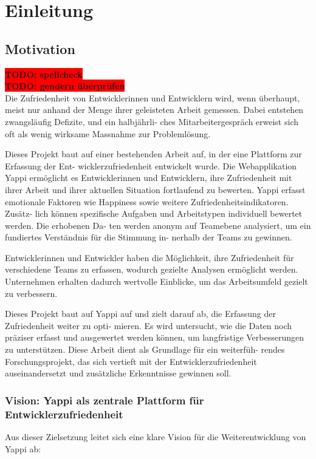 \documentclass[12pt,a4paper]{report}
\newcommand{\todo}[1]{\colorbox{red}{\textbf{TODO: #1}}\\}
\begin{document}
\chapter{Einleitung}

\section{Motivation}
\todo{spellcheck}
\todo{gendern überprüfen}

Die Zufriedenheit von Entwicklerinnen und Entwicklern wird, wenn überhaupt, meist nur anhand der
Menge ihrer geleisteten Arbeit gemessen. Dabei entstehen zwangsläufig Defizite, und ein halbjährli-
ches Mitarbeitergespräch erweist sich oft als wenig wirksame Massnahme zur Problemlösung.

Dieses Projekt baut auf einer bestehenden Arbeit auf, in der eine Plattform zur Erfassung der Ent-
wicklerzufriedenheit entwickelt wurde. Die Webapplikation Yappi ermöglicht es Entwicklerinnen und
Entwicklern, ihre Zufriedenheit mit ihrer Arbeit und ihrer aktuellen Situation fortlaufend zu bewerten.
Yappi erfasst emotionale Faktoren wie Happiness sowie weitere Zufriedenheitsindikatoren. Zusätz-
lich können spezifische Aufgaben und Arbeitstypen individuell bewertet werden. Die erhobenen Da-
ten werden anonym auf Teamebene analysiert, um ein fundiertes Verständnis für die Stimmung in-
nerhalb der Teams zu gewinnen.

Entwicklerinnen und Entwickler haben die Möglichkeit, ihre Zufriedenheit für verschiedene Teams zu
erfassen, wodurch gezielte Analysen ermöglicht werden. Unternehmen erhalten dadurch wertvolle
Einblicke, um das Arbeitsumfeld gezielt zu verbessern.

Dieses Projekt baut auf Yappi auf und zielt darauf ab, die Erfassung der Zufriedenheit weiter zu opti-
mieren. Es wird untersucht, wie die Daten noch präziser erfasst und ausgewertet werden können,
um langfristige Verbesserungen zu unterstützen. Diese Arbeit dient als Grundlage für ein weiterfüh-
rendes Forschungsprojekt, das sich vertieft mit der Entwicklerzufriedenheit auseinandersetzt und
zusätzliche Erkenntnisse gewinnen soll.

\subsection{Vision: Yappi als zentrale Plattform für Entwicklerzufriedenheit}

Aus dieser Zielsetzung leitet sich eine klare Vision für die Weiterentwicklung von Yappi ab:
\end{document}
